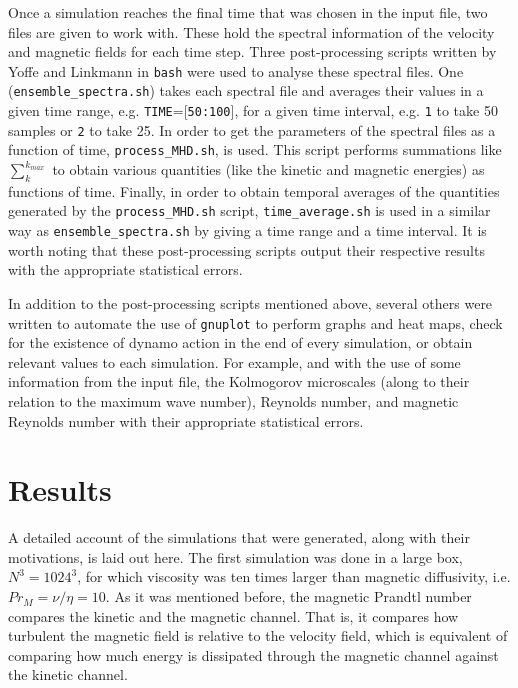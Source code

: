 \documentclass[12pt,a4paper]{report}
\begin{document}
Once a simulation reaches the final time that was chosen in the input file, two files are given to work with. These hold the spectral information of the velocity and magnetic fields for each time step. Three post-processing scripts written by Yoffe and Linkmann in \texttt{bash} were used to analyse these spectral files. One (\texttt{ensemble\_spectra.sh}) takes each spectral file and averages their values in a given time range, e.g. \texttt{TIME}=[\texttt{50:100}], for a given time interval, e.g. \texttt{1} to take 50 samples or \texttt{2} to take 25. In order to get the parameters of the spectral files as a function of time, \texttt{process\_MHD.sh}, is used. This script performs summations like $\sum_k^{k_{max}}$ to obtain various quantities (like the kinetic and magnetic energies) as functions of time. Finally, in order to obtain temporal averages of the quantities generated by the \texttt{process\_MHD.sh} script, \texttt{time\_average.sh} is used in a similar way as \texttt{ensemble\_spectra.sh} by giving a time range and a time interval. It is worth noting that these post-processing scripts output their respective results with the appropriate statistical errors.

In addition to the post-processing scripts mentioned above, several others were written to automate the use of \texttt{gnuplot} to perform graphs and heat maps, check for the existence of dynamo action in the end of every simulation, or obtain relevant values to each simulation. For example, and with the use of some information from the input file, the Kolmogorov microscales (along to their relation to the maximum wave number), Reynolds number, and magnetic Reynolds number with their appropriate statistical errors.

\chapter{Results}

A detailed account of the simulations that were generated, along with their motivations, is laid out here. The first simulation was done in a large box, $N^3=1024^3$, for which viscosity was ten times larger than magnetic diffusivity, i.e. $Pr_M=\nu/\eta=10$. As it was mentioned before, the magnetic Prandtl number compares the kinetic and the magnetic channel. That is, it compares how turbulent the magnetic field is relative to the velocity field, which is equivalent of comparing how much energy is dissipated through the magnetic channel against the kinetic channel. 
\end{document}
